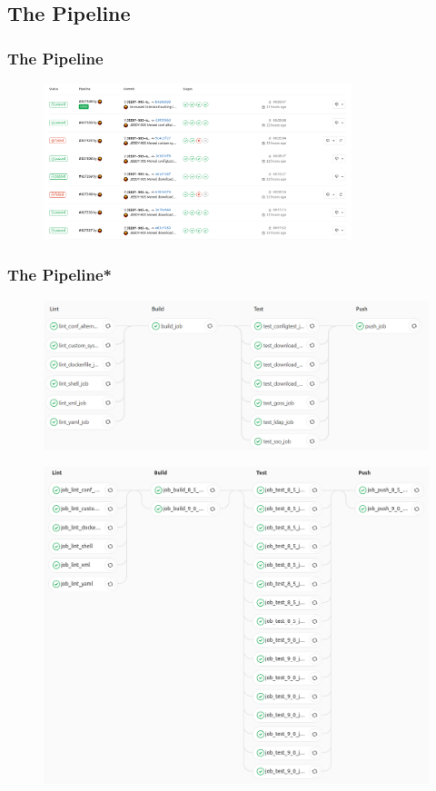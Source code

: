 \documentclass[14pt,aspectratio=169]{beamer}
\begin{document}
\subsection{The Pipeline}

\begin{frame}
  \frametitle{The Pipeline}
  \begin{figure}
    \includegraphics[width=0.8\textwidth]{images/pipeline_list.png}
  \end{figure}
\end{frame}

\begin{frame}
  \frametitle{The Pipeline*}
  \begin{figure}
    \includegraphics[width=\textwidth]{images/pipeline_2.png}
  \end{figure}
\end{frame}

\begin{frame}
  \begin{figure}
    \includegraphics[height=0.9\textheight]{images/pipeline_multi.png}
  \end{figure}
\end{frame}
\end{document}
